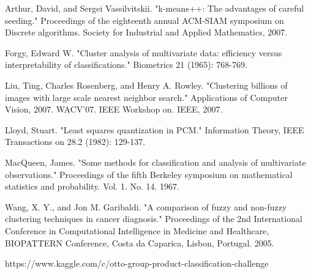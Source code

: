 \documentclass[10pt,twocolumn,letterpaper]{article}
\begin{document}
\begin{thebibliography}{6}

Arthur, David, and Sergei Vassilvitskii. "k-means++: The advantages of careful seeding." Proceedings of the eighteenth annual ACM-SIAM symposium on Discrete algorithms. Society for Industrial and Applied Mathematics, 2007.

Forgy, Edward W. "Cluster analysis of multivariate data: efficiency versus interpretability of classifications." Biometrics 21 (1965): 768-769.

Liu, Ting, Charles Rosenberg, and Henry A. Rowley. "Clustering billions of images with large scale nearest neighbor search." Applications of Computer Vision, 2007. WACV'07. IEEE Workshop on. IEEE, 2007.

Lloyd, Stuart. "Least squares quantization in PCM." Information Theory, IEEE Transactions on 28.2 (1982): 129-137.

MacQueen, James. "Some methods for classification and analysis of multivariate observations." Proceedings of the fifth Berkeley symposium on mathematical statistics and probability. Vol. 1. No. 14. 1967.

Wang, X. Y., and Jon M. Garibaldi. "A comparison of fuzzy and non-fuzzy clustering techniques in cancer diagnosis." Proceedings of the 2nd International Conference in Computational Intelligence in Medicine and Healthcare, BIOPATTERN Conference, Costa da Caparica, Lisbon, Portugal. 2005.

https://www.kaggle.com/c/otto-group-product-classification-challenge

\end{thebibliography}
\end{document}
